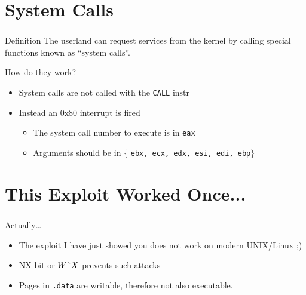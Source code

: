 \documentclass{beamer}
\begin{document}
\section{System Calls}
\begin{frame}[fragile]
  \frametitle{\insertsection}

\begin{block}{Definition}
The userland can request services from the kernel by calling special functions
known as ``system calls''.
\end{block}

\begin{block}{How do they work?}
\begin{itemize}
\item System calls are not called with the \texttt{CALL} instr\\
\vfill
\item Instead an 0x80 interrupt is fired\\
  \begin{itemize}
  \item The system call number to execute is in \texttt{eax}\\
  \item Arguments should be in $\{$ \texttt{ebx, ecx, edx, esi, edi, ebp}$\}$\\
  \end{itemize}
\end{itemize}
\end{block}

\end{frame}

\section{This Exploit Worked Once...}
\begin{frame}[fragile]
  \frametitle{\insertsection}

\begin{block}{Actually\ldots}
\begin{itemize}
  \item The exploit I have just showed you does not work on modern UNIX/Linux ;)\\
  \item NX bit or $W\char`\^X$ prevents such attacks\\
  \item Pages in \texttt{.data} are writable, therefore not also executable.
  \end{itemize}
\end{block}

\end{frame}
\end{document}
